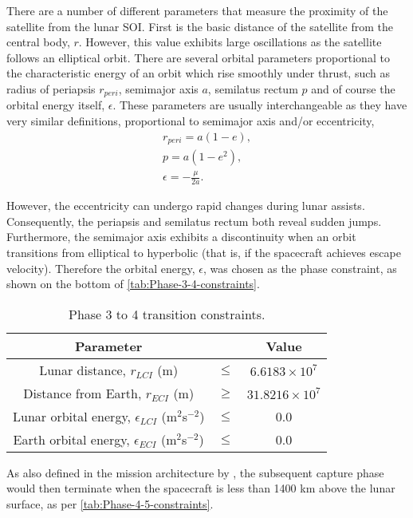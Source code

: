 There are a number of different parameters that measure the proximity of the satellite from the lunar SOI. First is the basic distance of the satellite from the central body, $r$. However, this value exhibits large oscillations as the satellite follows an elliptical orbit. There are several orbital parameters proportional to the characteristic energy of an orbit which rise smoothly under thrust, such as radius of periapsis $r_{peri}$, semimajor axis $a$, semilatus rectum $p$ and of course the orbital energy itself, $\epsilon$. These parameters are usually interchangeable as they have very similar definitions, proportional to semimajor axis and/or eccentricity, 
\begin{gather}
r_{peri} = a(1-e), \\
p = a(1-e^2), \\
\epsilon = -\frac{\mu}{2a}.
\end{gather}

However, the eccentricity can undergo rapid changes during lunar assists. Consequently, the periapsis and semilatus rectum both reveal sudden jumps. Furthermore, the semimajor axis exhibits a discontinuity when an orbit transitions from elliptical to hyperbolic (that is, if the spacecraft achieves escape velocity). Therefore the orbital energy, $\epsilon$, was chosen as the phase constraint, as shown on the bottom of \autoref{tab:Phase-3-4-constraints}.

\begin{table}[h]
\caption{Phase 3 to 4 transition constraints.} \label{tab:Phase-3-4-constraints}
\centering
\begin{tabular} {ccc}\toprule
Parameter & & Value\\\midrule
Lunar distance, $r_{LCI}$ (m) &$\le$& $6.6183\times 10^7$\\\midrule
Distance from Earth, $r_{ECI}$ (m) &$\ge$& $31.8216\times 10^7$\\\midrule
Lunar orbital energy, $\epsilon_{LCI}$ (m$^2$s$^{-2}$) &$\le$& 0.0 \\\midrule
Earth orbital energy, $\epsilon_{ECI}$ (m$^2$s$^{-2}$) &$\le$& 0.0 \\\bottomrule
\end{tabular}
\end{table}

As also defined in the mission architecture by \textcite{Roeser2006}, the subsequent capture phase would then terminate when the spacecraft is less than 1400 km above the lunar surface, as per \autoref{tab:Phase-4-5-constraints}.

